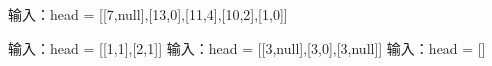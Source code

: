 输入：head = [[7,null],[13,0],[11,4],[10,2],[1,0]]

输入：head = [[1,1],[2,1]]
输入：head = [[3,null],[3,0],[3,null]]
输入：head = []
